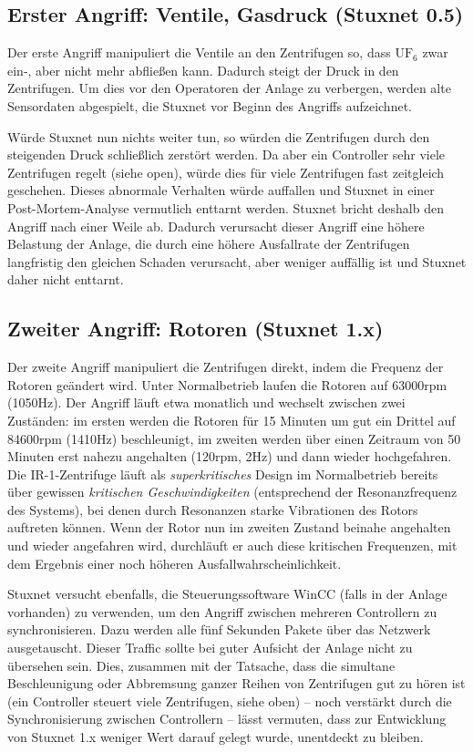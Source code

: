 \documentclass[a4paper]{article}
\begin{document}
\subsection{Erster Angriff: Ventile, Gasdruck (Stuxnet 0.5)}

Der erste Angriff manipuliert die Ventile an den Zentrifugen so,
dass $\mathrm{UF}_6$ zwar ein-, aber nicht mehr abfließen kann.
Dadurch steigt der Druck in den Zentrifugen.
Um dies vor den Operatoren der Anlage zu verbergen,
werden alte Sensordaten abgespielt, die Stuxnet vor Beginn des Angriffs aufzeichnet.

Würde Stuxnet nun nichts weiter tun, so würden die Zentrifugen durch den steigenden Druck schließlich zerstört werden.
Da aber ein Controller sehr viele Zentrifugen regelt (siehe open), würde dies für viele Zentrifugen fast zeitgleich geschehen.
Dieses abnormale Verhalten würde auffallen und Stuxnet in einer Post-Mortem-Analyse vermutlich enttarnt werden.
Stuxnet bricht deshalb den Angriff nach einer Weile ab.
Dadurch verursacht dieser Angriff eine höhere Belastung der Anlage,
die durch eine höhere Ausfallrate der Zentrifugen langfristig den gleichen Schaden verursacht,
aber weniger auffällig ist und Stuxnet daher nicht enttarnt.

\subsection{Zweiter Angriff: Rotoren (Stuxnet 1.x)}

Der zweite Angriff manipuliert die Zentrifugen direkt, indem die Frequenz der Rotoren geändert wird.
Unter Normalbetrieb laufen die Rotoren auf 63000rpm (1050Hz).
Der Angriff läuft etwa monatlich und wechselt zwischen zwei Zuständen:
im ersten werden die Rotoren für 15 Minuten um gut ein Drittel auf 84600rpm (1410Hz) beschleunigt,
im zweiten werden über einen Zeitraum von 50 Minuten erst nahezu angehalten (120rpm, 2Hz) und dann wieder hochgefahren.
Die IR-1-Zentrifuge läuft als \emph{superkritisches} Design im Normalbetrieb bereits über gewissen \emph{kritischen Geschwindigkeiten}
(entsprechend der Resonanzfrequenz des Systems), bei denen durch Resonanzen starke Vibrationen des Rotors auftreten können.
Wenn der Rotor nun im zweiten Zustand beinahe angehalten und wieder angefahren wird,
durchläuft er auch diese kritischen Frequenzen, mit dem Ergebnis einer noch höheren Ausfallwahrscheinlichkeit.

Stuxnet versucht ebenfalls, die Steuerungssoftware WinCC (falls in der Anlage vorhanden) zu verwenden, um den Angriff zwischen mehreren Controllern zu synchronisieren.\cite{dossier}
Dazu werden alle fünf Sekunden Pakete über das Netzwerk ausgetauscht.
Dieser Traffic sollte bei guter Aufsicht der Anlage nicht zu übersehen sein.
Dies, zusammen mit der Tatsache, dass die simultane Beschleunigung oder Abbremsung ganzer Reihen von Zentrifugen gut zu hören ist
(ein Controller steuert viele Zentrifugen, siehe oben) – noch verstärkt durch die Synchronisierung zwischen Controllern –
lässt vermuten, dass zur Entwicklung von Stuxnet 1.x weniger Wert darauf gelegt wurde, unentdeckt zu bleiben.
\end{document}

